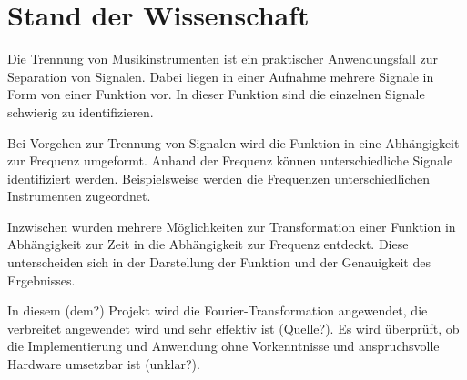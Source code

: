 \chapter{Stand der Wissenschaft}
\label{stand_der_wissenschaft}

Die Trennung von Musikinstrumenten ist ein praktischer Anwendungsfall zur Separation von Signalen. Dabei liegen in einer Aufnahme mehrere Signale in Form von einer Funktion vor. In dieser Funktion sind die einzelnen Signale schwierig zu identifizieren.

\par

Bei Vorgehen zur Trennung von Signalen wird die Funktion in eine Abhängigkeit zur Frequenz umgeformt. Anhand der Frequenz können unterschiedliche Signale identifiziert werden. Beispielsweise werden die Frequenzen unterschiedlichen Instrumenten zugeordnet.

\par

Inzwischen wurden mehrere Möglichkeiten zur Transformation einer Funktion in Abhängigkeit zur Zeit in die Abhängigkeit zur Frequenz entdeckt. Diese unterscheiden sich in der Darstellung der Funktion und der Genauigkeit des Ergebnisses.

\par

In diesem (dem?) Projekt wird die Fourier-Transformation angewendet, die verbreitet angewendet wird und sehr effektiv ist (Quelle?). Es wird überprüft, ob die Implementierung und Anwendung ohne Vorkenntnisse und anspruchsvolle Hardware umsetzbar ist (unklar?).



